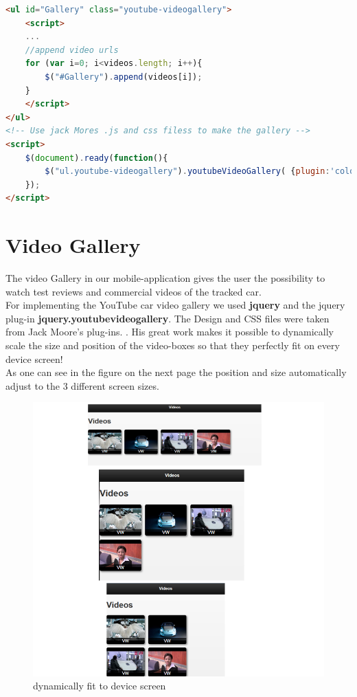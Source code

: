\begin{lstlisting}[language=html, caption= 
extracts from the video gallery src]
<ul id="Gallery" class="youtube-videogallery">
	<script>
	... 
	//append video urls
	for (var i=0; i<videos.length; i++){
		$("#Gallery").append(videos[i]);
	}
	</script>
</ul>
<!-- Use jack Mores .js and css filess to make the gallery -->
<script>
    $(document).ready(function(){
        $("ul.youtube-videogallery").youtubeVideoGallery( {plugin:'colorbox',assetFolder:'../'} );
    });
</script> 
\end{lstlisting}

\section{Video Gallery}
The video Gallery in our mobile-application gives the user the possibility to watch test reviews and commercial videos of the tracked car.
\\

   
For implementing the YouTube car video gallery we used \textbf{jquery} and the jquery plug-in \textbf{jquery.youtubevideogallery}. The Design and CSS files were taken from Jack Moore's plug-ins. \cite{jqueryVideo}. His great work makes it possible to dynamically scale the size and position of the video-boxes so that they perfectly fit on every device screen! 
\\

As one can see in the figure on the next page the position and size automatically adjust to the 3 different screen sizes.    

\begin{figure}[H]
\centering
\includegraphics[width=\textwidth,height=\textheight,keepaspectratio]{graphics/dynamic.png}
\caption{dynamically fit to device screen}
\end{figure}  

